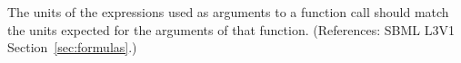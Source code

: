 The units of the expressions used as arguments to a function call
should match the units expected for the arguments of that function.
(References: SBML L3V1 Section~\ref{sec:formulas}.)
